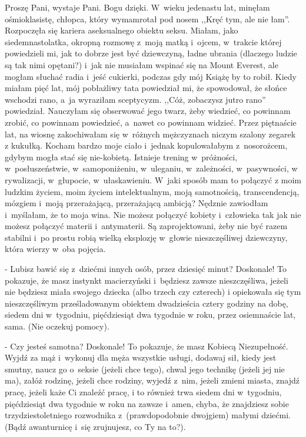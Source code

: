 \documentclass[oneside,polish,12pt,sfheadings]{mwbk}
\begin{document}
Proszę Pani, wystaje Pani. Bogu dzięki. W~wieku jedenastu lat, minęłam
ośmioklasistę, chłopca, który wymamrotał pod nosem ,,Kręć tym, ale
nie łam''. Rozpoczęła się kariera aseksualnego obiektu seksu. Miałam,
jako siedemnastolatka, okropną rozmowę z~moją matką i~ojcem, w~trakcie
której powiedzieli mi, jak to dobrze jest być dziewczyną, ładne ubrania
(dlaczego ludzie są tak nimi opętani?) i~jak nie musiałam wspinać
się na Mount Everest, ale mogłam słuchać radia i~jeść cukierki, podczas
gdy mój Książę by to robił. Kiedy miałam pięć lat, mój pobłażliwy
tata powiedział mi, że spowodował, że słońce wschodzi rano, a~ja wyraziłam
sceptycyzm. ,,Cóż, zobaczysz jutro rano'' powiedział. Nauczyłam się
obserwować jego twarz, żeby wiedzieć, co powinnam zrobić, co powinnam
powiedzieć, a~nawet co powinnam widzieć. Przez piętnaście lat, na
wiosnę zakochiwałam się w~różnych mężczyznach niczym szalony zegarek
z kukułką. Kocham bardzo moje ciało i~jednak kopulowałabym z~nosorożcem,
gdybym mogła stać się nie-kobietą. Istnieje trening w~próżności, w~posłuszeństwie, w~samoponiżeniu, w~uleganiu, w~zależności, w~pasywności,
w rywalizacji, w~głupocie, w~ułaskawieniu. W~jaki sposób mam to połączyć
z moim ludzkim życiem, moim życiem intelektualnym, moją samotnością,
transcendencją, mózgiem i~moją przerażającą, przerażającą ambicją?
Nędznie zawiodłam i~myślałam, że to moja wina. Nie możesz połączyć
kobiety i~człowieka tak jak nie możesz połączyć materii i~antymaterii.
Są zaprojektowani, żeby nie być razem stabilni i~po prostu robią wielką
eksplozję w~głowie nieszczęśliwej dziewczyny, która wierzy w~oba pojęcia.

- Lubisz bawić się z~dziećmi innych osób, przez dziesięć minut? Doskonale!
To pokazuje, że masz instynkt macierzyński i~będziesz zawsze nieszczęśliwa,
jeżeli nie będziesz miała swojego dziecka (albo trzech czy czterech)
i opiekowała się tym nieszczęśliwym prześladowanym obiektem dwadzieścia
cztery godziny na dobę, siedem dni w~tygodniu, pięćdziesiąt dwa tygodnie
w roku, przez osiemnaście lat, sama. (Nie oczekuj pomocy).

- Czy jesteś samotna? Doskonale! To pokazuje, że masz Kobiecą Niezupełność.
Wyjdź za mąż i~wykonuj dla męża wszystkie usługi, dodawaj sił, kiedy
jest smutny, naucz go o~seksie (jeżeli chce tego), chwal jego technikę
(jeżeli jej nie ma), załóż rodzinę, jeżeli chce rodziny, wyjedź z~nim, jeżeli zmieni miasta, znajdź pracę, jeżeli każe Ci znaleźć pracę,
i to również trwa siedem dni w~tygodniu, pięćdziesiąt dwa tygodnie
w roku na zawsze i~amen, chyba, że znajdziesz sobie trzydziestoletniego
rozwodnika z~(prawdopodobnie dwojgiem) małymi dziećmi. (Bądź awanturnicę
i~się zrujnujesz, co Ty na to?).
\end{document}
